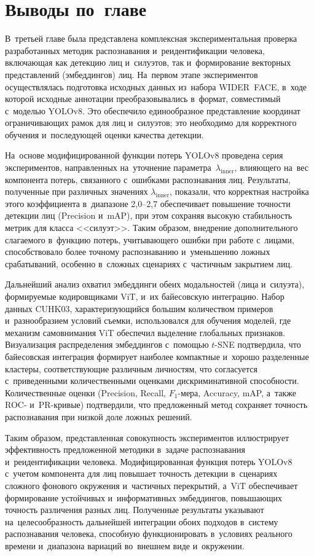 \section{Выводы по~главе}\label{sec:ch3/conclusion}

В~третьей главе была представлена комплексная экспериментальная
проверка разработанных методик распознавания и~реидентификации
человека, включающая как детекцию лиц и~силуэтов, так и~формирование
векторных представлений (эмбеддингов) лиц. На~первом этапе
экспериментов осуществлялась подготовка исходных данных из~набора
WIDER~FACE, в~ходе которой исходные аннотации преобразовывались
в~формат, совместимый с~моделью YOLOv8. Это обеспечило единообразное
представление координат ограничивающих рамок для лиц и~силуэтов; это
необходимо для корректного обучения и~последующей оценки
качества детекции.

На~основе модифицированной функции потерь YOLOv8 проведена серия
экспериментов, направленных на~уточнение
параметра~$\lambda_{\text{inner}}$, влияющего на~вес компонента потерь,
связанного с~ошибками распознавания лиц. Результаты, полученные при
различных значениях $\lambda_{\text{inner}}$, показали, что корректная
настройка этого коэффициента в~диапазоне 2,0--2,7 обеспечивает
повышение точности детекции лиц (Precision и~mAP), при этом сохраняя
высокую стабильность метрик для класса <<силуэт>>. Таким
образом, внедрение дополнительного слагаемого в~функцию потерь,
учитывающего ошибки при работе с~лицами, способствовало более точному
распознаванию и~уменьшению ложных срабатываний, особенно в~сложных
сценариях с~частичным закрытием лиц.

Дальнейший анализ охватил эмбеддинги обеих модальностей (лица
и~силуэта), формируемые кодировщиками ViT, и~их байесовскую
интеграцию. Набор данных CUHK03, характеризующийся большим количеством
примеров и~разнообразием условий съемки, использовался для обучения
моделей, где механизм самовнимания ViT обеспечил выделение
глобальных признаков. Визуализация распределения эмбеддингов
с~помощью $t$-SNE подтвердила, что байесовская интеграция формирует
наиболее компактные и~хорошо разделенные кластеры, соответствующие
различным личностям, что согласуется с~приведенными количественными оценками дискриминативной способности.
Количественные оценки (Precision, Recall, $F_1$-мера, Accuracy, mAP,
а~также ROC- и~PR-кривые) подтвердили, что предложенный метод сохраняет
точность распознавания при низкой доле ложных решений.

Таким образом, представленная совокупность экспериментов
иллюстрирует эффективность предложенной методики в~задаче
распознавания и~реидентификации человека. Модифицированная функция
потерь YOLOv8 с~учетом компонента для лиц повышает точность детекции
в~сценариях сложного фонового окружения и~частичных перекрытий,
а~ViT обеспечивает формирование устойчивых и~информативных
эмбеддингов, повышающих точность различения разных лиц.
Полученные результаты указывают на~целесообразность дальнейшей
интеграции обоих подходов в~систему распознавания человека, способную
функционировать в~условиях реального времени и~диапазона
вариаций во~внешнем виде и~окружении.

